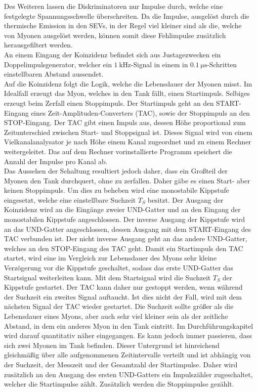 Des Weiteren lassen die Diskriminatoren nur Impulse durch, welche eine festgelegte Spannungsschwelle überschreiten.
Da die Impulse, ausgelöst durch die thermische Emission in den SEVs, in der Regel viel kleiner sind als die, welche von Myonen ausgelöst werden, können somit diese Fehlimpulse zusätzlich herausgefiltert werden.\\
An einem Eingang der Koinzidenz befindet sich aus Justagezwecken ein Doppelimpulsgenerator, welcher ein $\SI{1}{\kilo\hertz}$-Signal in einem in $\SI{0,1}{\micro\second}$-Schritten einstellbaren Abstand aussendet.\\
Auf die Koinzidenz folgt die Logik, welche die Lebensdauer der Myonen misst.
Im Idealfall erzeugt das Myon, welches in den Tank fällt, einen Startimpuls.
Selbiges erzeugt beim Zerfall einen Stoppimpuls.
Der Startimpuls geht an den START-Eingang eines Zeit-Amplituden-Converters (TAC), sowie der Stoppimpuls an den STOP-Eingang.
Der TAC gibt einen Impuls aus, dessen Höhe proportional zum Zeitunterschied zwischen Start- und Stoppsignal ist.
Dieses Signal wird von einem Vielkanalanalysator je nach Höhe einem Kanal zugeordnet und zu einem Rechner weitergeleitet.
Das auf dem Rechner vorinstallierte Programm speichert die Anzahl der Impulse pro Kanal ab.\\
Das Aussehen der Schaltung resultiert jedoch daher, dass ein Großteil der Myonen den Tank durchquert, ohne zu zerfallen.
Daher gäbe es einen Start- aber keinen Stoppimpuls.
Um dies zu beheben wird eine monostabile Kippstufe eingesetzt, welche eine einstellbare Suchzeit $T_S$ besitzt.
Der Ausgang der Koinzidenz wird an die Eingänge zweier UND-Gatter und an den Eingang der monostabilen Kippstufe angeschlossen.
Der inverse Ausgang der Kippstufe wird an das UND-Gatter angeschlossen, dessen Ausgang mit dem START-Eingang des TAC verbunden ist.
Der nicht inverse Ausgang geht an das andere UND-Gatter, welches an den STOP-Eingang des TAC geht.
Damit ein Startimpuls den TAC startet, wird eine im Vergleich zur Lebensdauer des Myons sehr kleine Verzögerung vor die Kippstufe geschaltet, sodass das erste UND-Gatter das Startsignal weiterleiten kann.
Mit dem Startsignal wird die Suchzeit $T_S$ der Kippstufe gestartet.
Der TAC kann daher nur gestoppt werden, wenn während der Suchzeit ein zweites Signal auftaucht.
Ist dies nicht der Fall, wird mit dem nächsten Signal der TAC wieder gestartet.
Die Suchzeit sollte größer als die Lebensdauer eines Myons, aber auch sehr viel kleiner sein als der zeitliche Abstand, in dem ein anderes Myon in den Tank eintritt.
Im Durchführungskapitel wird darauf quantitativ näher eingegangen.
Es kann jedoch immer passieren, dass sich zwei Myonen im Tank befinden.
Dieser Untergrund ist hinreichend gleichmäßig über alle aufgenommenen Zeitintervalle verteilt und ist abhängig von der Suchzeit, der Messzeit und der Gesamtzahl der Startimpulse.
Daher wird zusätzlich an den Ausgang des ersten UND-Gatters ein Impulszähler zugeschaltet, welcher die Startimpulse zählt.
Zusätzlich werden die Stoppimpulse gezählt.
